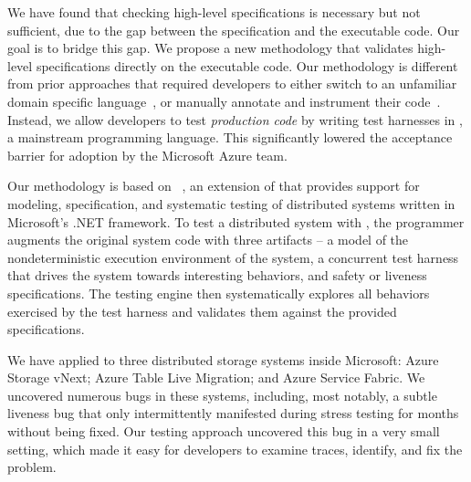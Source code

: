 We have found that checking high-level specifications is necessary but not sufficient, due to the gap between the specification and the executable code. Our goal is to bridge this gap. We propose a new methodology that validates high-level specifications directly on the executable code. Our methodology is different from prior approaches that required developers to either switch to an unfamiliar domain specific language~\cite{killian2007life, desai2015building}, or manually annotate and instrument their code~\cite{simsa2011dbug}. Instead, we allow developers to test \emph{production code} by writing test harnesses in \csharp, a mainstream programming language. This significantly lowered the acceptance barrier for adoption by the Microsoft Azure team.

Our methodology is based on \psharp~\cite{deligiannis2015psharp}, an extension of \csharp that provides support for modeling, specification, and systematic testing of distributed systems written in Microsoft's .NET framework. To test a distributed system with \psharp, the programmer augments the original system code with three artifacts -- a model of the nondeterministic execution environment of the system, a concurrent test harness that drives the system towards interesting behaviors, and safety or liveness specifications.
The \psharp testing engine then systematically explores all behaviors exercised by the test harness and validates them against the provided specifications.

We have applied \psharp to three distributed storage systems inside Microsoft: Azure Storage vNext; Azure Table Live Migration; and Azure Service Fabric.
We uncovered numerous bugs in these systems, including, most notably, a subtle liveness bug that only intermittently manifested during stress testing for months without being fixed.
Our testing approach uncovered this bug in a very small setting, which made it easy for developers to examine traces, identify, and fix the problem.

